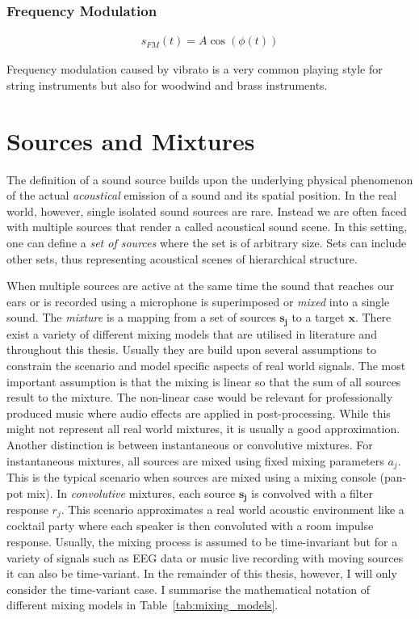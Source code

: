 \subsubsection{Frequency Modulation}
\begin{align}
    s_{FM}(t) = A \cos(\phi(t))
\end{align}

Frequency  modulation  caused  by  vibrato  is  a  very  common
playing  style  for  string  instruments  but  also  for  woodwind  and
brass instruments.


\hypertarget{sources-and-mixtures}{%
\section{Sources and Mixtures}\label{sources-and-mixtures}}

The definition of a sound source builds upon the underlying physical
phenomenon of the actual \emph{acoustical} emission of a sound and its
spatial position.
In the real world, however, single isolated sound sources are rare.
Instead we are often faced with multiple sources that render a called acoustical sound scene.
In this setting, one can define a \emph{set of sources} where the set is of arbitrary size.
Sets can include other sets, thus representing acoustical scenes of hierarchical structure.

When multiple sources are active at the same time the sound that reaches our ears or is recorded using a microphone is superimposed or \emph{mixed} into a single sound.
The \emph{mixture} is a mapping from a set of sources
\(\mathbf{s_j}\) to a target \(\mathbf{x}\).
There exist a variety of different mixing models that are utilised in literature and throughout this thesis.
Usually they are build upon several assumptions to constrain the scenario and model specific aspects of real world signals.
The most important assumption is that the mixing is linear so that the sum of all sources result to the mixture.
The non-linear case would be relevant for professionally produced music where audio effects are applied in post-processing.
While this might not represent all real world mixtures, it is usually a good approximation.
Another distinction is between instantaneous or convolutive mixtures.
For instantaneous mixtures, all sources are mixed using fixed mixing parameters \(a_j\).
This is the typical scenario when sources are mixed using a mixing console (pan-pot mix).
In \emph{convolutive} mixtures, each source \(\mathbf{s_j}\) is convolved with a filter response \(r_j\).
This scenario approximates a real world acoustic environment like a cocktail party where each speaker is then convoluted with a room impulse response.
Usually, the mixing process is assumed to be time-invariant but for a variety of signals such as EEG data or music live recording with moving sources it can also be time-variant.
In the remainder of this thesis, however, I will only consider the time-variant case.
I summarise the mathematical notation of different mixing models in Table~\ref{tab:mixing_models}.

